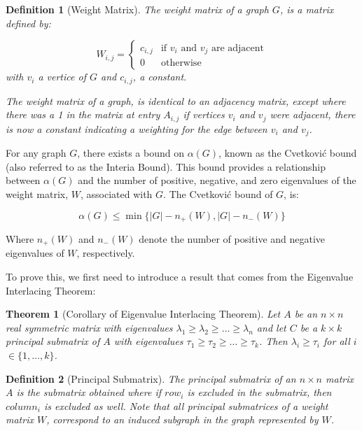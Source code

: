 \documentclass[12pt]{article}
\theoremstyle{parenbold}
\newtheorem{definition}{Definition}[section]
\newtheorem{theorem}{Theorem}[section]
\begin{document}
\begin{definition}[Weight Matrix]
The weight matrix of a graph $G$, is a matrix defined by:

\begin{equation}
    W_{i,j} = 
    \begin{cases}
        c_{i,j} & \mbox{if $v_i$ and $v_j$ are adjacent} \\
        0 & \mbox{otherwise}
    \end{cases}
\end{equation}
with $v_i$ a vertice of $G$ and $c_{i,j}$, a constant.

The weight matrix of a graph, is identical to an adjacency matrix, except where there was a 1 in the matrix at entry $A_{i,j}$ if vertices $v_i$ and $v_j$ were adjacent, there is now a constant indicating a weighting for the edge between $v_i$ and $v_j$.

\end{definition}

For any graph $G$, there exists a bound on $\alpha(G)$, known as the Cvetkovi\'c bound (also referred to as the Interia Bound). This bound provides a relationship between $\alpha(G)$ and the number of positive, negative, and zero eigenvalues of the weight matrix, $W$, associated with $G$. The Cvetkovi\'c bound of $G$, is:

\begin{equation}
\alpha(G) \leq \min\{|G| - n_+(W),|G|-n_-(W)\}
\end{equation}

Where $n_+(W)$ and $n_-(W)$ denote the number of positive and negative eigenvalues of $W$, respectively.

To prove this, we first need to introduce a result that comes from the Eigenvalue Interlacing Theorem:

\begin{theorem}[Corollary of Eigenvalue Interlacing Theorem]
\label{interlacing}
Let $A$ be an $n\times n$ real symmetric matrix with eigenvalues $\lambda_1 \geq \lambda_2 \geq \ldots \geq \lambda_n$ and let $C$ be a $k\times k$ principal submatrix of $A$ with eigenvalues $\tau_1 \geq \tau_2 \geq \ldots \geq \tau_k$. Then $\lambda_i \geq \tau_i$ for all $i$ $\in \{1,\ldots ,k\}$. \cite{sinkovic2016graph}
\end{theorem}

\begin{definition}[Principal Submatrix]
The principal submatrix of an $n\times n$ matrix $A$ is the submatrix obtained where if $row_i$ is excluded in the submatrix, then $column_i$ is excluded as well. Note that all principal submatrices of a weight matrix $W$, correspond to an induced subgraph in the graph represented by $W$.
\end{definition}
\end{document}
